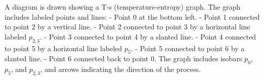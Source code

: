 A diagram is drawn showing a T-s (temperature-entropy) graph. The graph includes labeled points and lines:  
- Point 0 at the bottom left.  
- Point 1 connected to point 2 by a vertical line.  
- Point 2 connected to point 3 by a horizontal line labeled \( p_{2,3} \).  
- Point 3 connected to point 4 by a slanted line.  
- Point 4 connected to point 5 by a horizontal line labeled \( p_5 \).  
- Point 5 connected to point 6 by a slanted line.  
- Point 6 connected back to point 0.  
The graph includes isobars \( p_0 \), \( p_5 \), and \( p_{2,3} \), and arrows indicating the direction of the process.